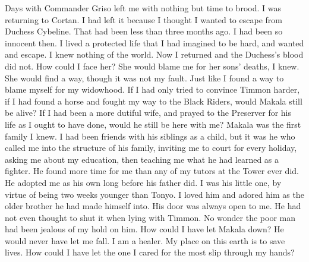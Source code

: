 \documentclass{article}
\begin{document}
Days with Commander Griso left me with nothing but time to brood. I was returning to Cortan. I had left it because I thought I wanted to escape from Duchess Cybeline. That had been less than three months ago. I had been so innocent then. I lived a protected life that I had imagined to be hard, and wanted and escape. I knew nothing of the world. Now I returned and the Duchess's blood did not. How could I face her? She would blame me for her sons' deaths, I knew. She would find a way, though it was not my fault. Just like I found a way to blame myself for my widowhood. If I had only tried to convince Timmon harder, if I had found a horse and fought my way to the Black Riders, would Makala still be alive? If I had been a more dutiful wife, and prayed to the Preserver for his life as I ought to have done, would he still be here with me? Makala was the first family I knew. I had been friends with his siblings as a child, but it was he who called me into the structure of his family, inviting me to court for every holiday, asking me about my education, then teaching me what he had learned as a fighter. He found more time for me than any of my tutors at the Tower ever did. He adopted me as his own long before his father did. I was his little one, by virtue of being two weeks younger than Tonyo. I loved him and adored him as the older brother he had made himself into. His door was always open to me. He had not even thought to shut it when lying with Timmon. No wonder the poor man had been jealous of my hold on him. How could I have let Makala down? He would never have let me fall. I am a healer. My place on this earth is to save lives. How could I have let the one I cared for the most slip through my hands?
\end{document}

